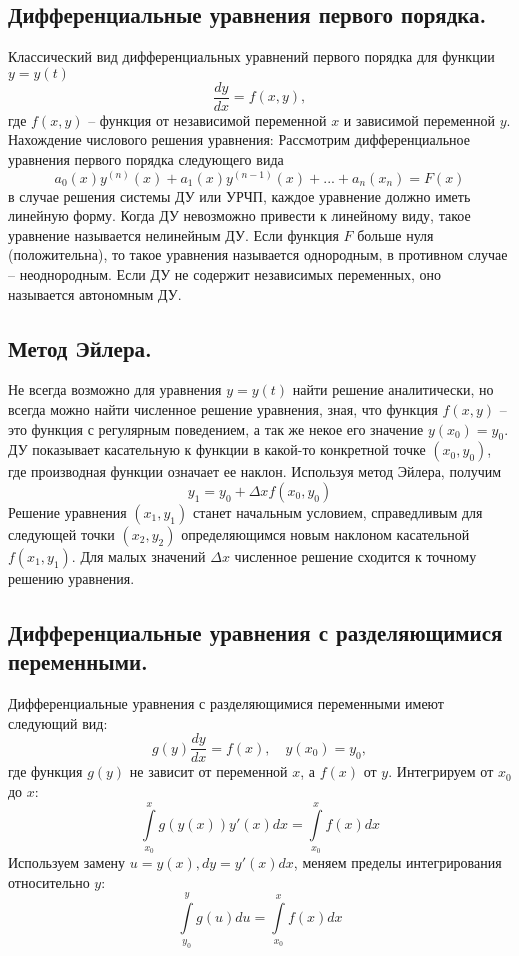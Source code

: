 \subsection{Дифференциальные уравнения первого порядка.}

Классический вид дифференциальных уравнений первого порядка для функции $y = y(t)$
\[
    \frac{dy}{dx} = f(x,y),
\]
где $f(x,y)$ -- функция от независимой переменной $x$ и зависимой переменной $y$.
\newline
Нахождение числового решения уравнения:
\newline
Рассмотрим дифференциальное уравнения первого порядка следующего вида
\[
    a_0(x) y^{(n)} (x) + a_1(x) y^{(n-1)} (x) + ... + a_n(x_n) = F(x)
\]
в случае решения системы ДУ или УРЧП, каждое уравнение должно иметь линейную форму. Когда ДУ невозможно привести к линейному виду, такое уравнение называется нелинейным ДУ.
\newline
Если функция $F$ больше нуля (положительна), то такое уравнения называется однородным, в противном случае -- неоднородным.
\newline
Если ДУ не содержит независимых переменных, оно называется автономным ДУ.

\subsection{Метод Эйлера.}
Не всегда возможно для уравнения $y = y(t)$ найти решение аналитически, но всегда можно найти численное решение уравнения, зная, что функция $f(x,y)$ -- это функция с регулярным поведением, а так же некое его значение $y(x_0) = y_0$. ДУ показывает касательную к функции в какой-то конкретной точке $(x_0, y_0)$, где производная функции означает ее наклон.
\newline
Используя метод Эйлера, получим $$y_1 = y_0 + \Delta x f(x_0, y_0)$$
Решение уравнения $(x_1, y_1)$ станет начальным условием, справедливым для следующей точки $(x_2, y_2) $ определяющимся новым наклоном касательной $f(x_1, y_1)$. Для малых значений $\Delta x$ численное решение сходится к точному решению уравнения.

\subsection{Дифференциальные уравнения с разделяющимися переменными.}
Дифференциальные уравнения с разделяющимися переменными имеют следующий вид:
\[
    g(y) \frac{dy}{dx} = f(x), \quad y(x_0) = y_0,
\]
где функция $g(y)$ не зависит от переменной $x$, а $f(x)$ от $y$. Интегрируем от $x_0$ до $x$:
\[
    \int \limits_{x_0}^x g(y(x))y'(x) dx = \int \limits_{x_0}^x f(x) dx
\]
Используем замену $u = y(x), dy = y'(x)dx$, меняем пределы интегрирования относительно $y$:
\[
    \int \limits_{y_0}^{y} g(u) du = \int \limits_{x_0}^x f(x) dx
\]